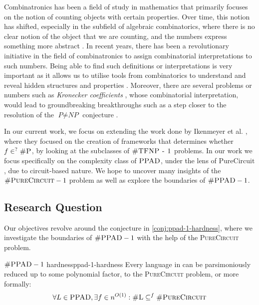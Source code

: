 Combinatronics has been a field of study in mathematics that primarily focuses on
the notion of counting objects with certain properties. Over time, this notion
has shifted, especially in the subfield of algebraic combinatorics, where
there is no clear notion of the object that we are counting,
and the numbers express something more abstract \cite{pak_WhatCombinatorialInterpretation_2022}.
In recent years, there has been a revolutionary
initiative in the field of combinatronics to assign combinatorial interpretations to such numbers.
Being able to find such definitions or interpretations is very important
as it allows us to utilise tools from combinatorics to understand
and reveal hidden structures and properties \cite{pak_WhatCombinatorialInterpretation_2022}. 
Moreover, there are several problems or numbers such as \textit{Kronecker coefficients} \cite{makar_AnalysisKroneckerProduct_1949},
whose combinatorial interpretation, would lead to groundbreaking breakthroughs such as a step closer to the resolution of the $\textit{P} \neq \textit{NP}$
conjecture \cite{ikenmeyer_WhatWhatNot_2022, ikenmeyer_VanishingKroneckerCoefficients_2017}.


In our current work, we focus on extending the work done by
Ikenmeyer et al. \cite{ikenmeyer_WhatWhatNot_2022}, where they focused on the creation of frameworks
that determines whether $f \in^? \textsc{\#P}$, by looking
at the subclasses of $\textsc{\#TFNP - 1}$ problems.
In our work we focus specifically on the complexity class of $\textsc{PPAD}$, under the lens of $\text{PureCircuit}$,
due to circuit-based nature.
We hope to uncover many insights of the $\textsc{\#PureCircuit} -1$ problem 
as well as explore the boundaries of $\textsc{\#PPAD} -1$.


\subsection{Research Question}

Our objectives revolve around the conjecture in \ref{conj:ppad-1-hardness}, where
we investigate the boundaries of $\textnormal{\textsc{\#PPAD}}-1$ with the help of the \textsc{PureCircuit} problem.
\begin{conjecturebox}{$\textnormal{\textsc{\#PPAD}}-1$ hardness}{ppad-1-hardness}
    Every language in  can be parsimoniously reduced up to some polynomial factor, to the
    \textsc{PureCircuit} problem, or more formally:
    $$
    \forall L \in \textnormal{\textsc{PPAD}}, \exists f \in n^{O(1)}: 
    \textnormal{\textsc{\#L}} \subseteq^f \textnormal{\textsc{\#PureCircuit}}
    $$
\end{conjecturebox}




